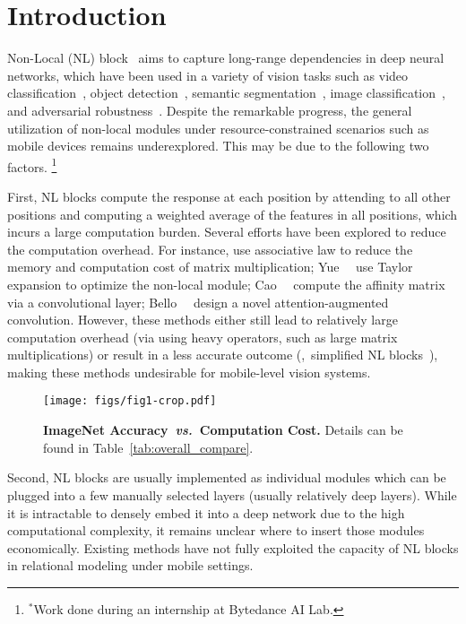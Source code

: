 \documentclass[10pt,twocolumn,letterpaper]{article}
\begin{document}
\section{Introduction} \label{sec:intro}
Non-Local (NL) block~\cite{bello2019attention, wang2018non} aims to capture long-range dependencies in deep neural networks, which have been used in a variety of vision tasks such as video classification~\cite{wang2018non}, object detection~\cite{wang2018non}, semantic segmentation~\cite{zhao2018psanet,zhou2019multi}, image classification~\cite{bello2019attention}, and adversarial robustness~\cite{xie2019feature}. Despite the remarkable progress, the general utilization of non-local modules under resource-constrained scenarios such as mobile devices remains underexplored. This may be due to the following two factors. \let\thefootnote\relax\footnote{$^\ast$Work done during an internship at Bytedance AI Lab.}

First, NL blocks compute the response at each position by attending to all other positions
and computing a weighted average of the features in all positions, which incurs a large computation burden. Several efforts have been explored to reduce the computation overhead. For instance, \cite{chen20182,levi2018efficient} use associative law to reduce the memory and computation cost of matrix multiplication; Yue~\etal~\cite{yue2018compact} use Taylor expansion to optimize the non-local module; Cao~\etal~\cite{cao2019gcnet} compute the affinity matrix via a convolutional layer; Bello~\etal~\cite{bello2019attention} design a novel attention-augmented convolution. 
However, these methods either still lead to relatively large computation overhead (via using heavy operators, such as large matrix multiplications) or result in a less accurate outcome (\eg,~simplified NL blocks~\cite{cao2019gcnet}), making these methods undesirable for mobile-level vision systems. 

\begin{figure}[tb]
\centering
\texttt{[image: figs/fig1-crop.pdf]}
\caption{\textbf{ImageNet Accuracy~\emph{vs.}~Computation Cost.} Details can be found in Table~\ref{tab:overall_compare}.}
\label{fig:main_acc}
\vspace{-1em}
\end{figure}

Second, NL blocks are usually implemented as individual modules which can be plugged into a few manually selected layers (usually relatively deep layers). While it is intractable to densely embed it into a deep network due to the high computational complexity, it remains unclear where to insert those modules economically. Existing methods have not fully exploited the capacity of NL blocks in relational modeling under mobile settings.
\end{document}
